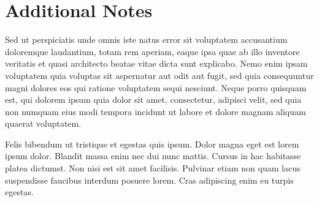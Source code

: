 \documentclass{resume}
\begin{document}
\section{Additional Notes}
\begin{cvpar}
    Sed ut perspiciatis unde omnis iste natus error sit voluptatem accusantium doloremque laudantium, totam rem aperiam, eaque ipsa quae ab illo inventore veritatis et quasi architecto beatae vitae dicta sunt explicabo. Nemo enim ipsam voluptatem quia voluptas sit aspernatur aut odit aut fugit, sed quia consequuntur magni dolores eos qui ratione voluptatem sequi nesciunt. Neque porro quisquam est, qui dolorem ipsum quia dolor sit amet, consectetur, adipisci velit, sed quia non numquam eius modi tempora incidunt ut labore et dolore magnam aliquam quaerat voluptatem. 
\end{cvpar}
\begin{cvpar}
    Felis bibendum ut tristique et egestas quis ipsum. Dolor magna eget est lorem ipsum dolor. Blandit massa enim nec dui nunc mattis. Cursus in hac habitasse platea dictumst. Non nisi est sit amet facilisis. Pulvinar etiam non quam lacus suspendisse faucibus interdum posuere lorem. Cras adipiscing enim eu turpis egestas.
\end{cvpar}
\end{document}
